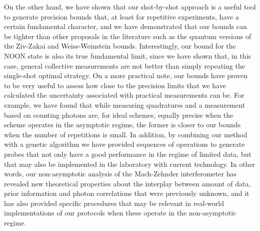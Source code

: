 On the other hand, we have shown that our shot-by-shot approach is a useful tool to generate precision bounds that, at least for repetitive experiments, have a certain fundamental character, and we have demonstrated that our bounds can be tighter than other proposals in the literature such as the quantum versions of the Ziv-Zakai and Weiss-Weinstein bounds. Interestingly, our bound for the NOON state is also its true fundamental limit, since we have shown that, in this case, general collective measurements are not better than simply repeating the single-shot optimal strategy. On a more practical note, our bounds have proven to be very useful to assess how close to the precision limits that we have calculated the uncertainty associated with practical measurements can be. For example, we have found that while measuring quadratures and a measurement based on counting photons are, for ideal schemes, equally precise when the scheme operates in the asymptotic regime, the former is closer to our bounds when the number of repetitions is small. In addition, by combining our method with a genetic algorithm we have provided sequences of operations to generate probes that not only have a good performance in the regime of limited data, but that may also be implemented in the laboratory with current technology. In other words, our non-asymptotic analysis of the Mach-Zehnder interferometer has revealed new theoretical properties about the interplay between amount of data, prior information and photon correlations that were previously unknown, and it has also provided specific procedures that may be relevant in real-world implementations of our protocols when these operate in the non-asymptotic regime.  

